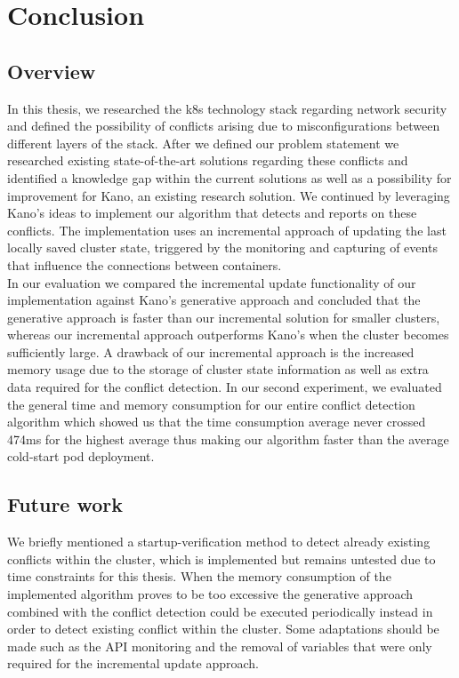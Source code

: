 \chapter{Conclusion}                     \label{ch:conclusion}
\section{Overview} \label{sec:overview}
In this thesis, we researched the \acrshort{k8s} technology stack regarding network security and defined the possibility of conflicts arising due to misconfigurations between different layers of the stack. After we defined our problem statement we researched existing state-of-the-art solutions regarding these conflicts and identified a knowledge gap within the current solutions as well as a possibility for improvement for Kano, an existing research solution. We continued by leveraging Kano's ideas to implement our algorithm that detects and reports on these conflicts. The implementation uses an incremental approach of updating the last locally saved cluster state, triggered by the monitoring and capturing of events that influence the connections between containers. 
\\[10pt]

In our evaluation we compared the incremental update functionality of our implementation against Kano's generative approach and concluded that the generative approach is faster than our incremental solution for smaller clusters, whereas our incremental approach outperforms Kano's when the cluster becomes sufficiently large. A drawback of our incremental approach is the increased memory usage due to the storage of cluster state information as well as extra data required for the conflict detection. In our second experiment, we evaluated the general time and memory consumption for our entire conflict detection algorithm which showed us that the time consumption average never crossed 474ms for the highest average thus making our algorithm faster than the average cold-start pod deployment.
\\[10pt]



\section{Future work} \label{sec:futurework}
We briefly mentioned a startup-verification method to detect already existing conflicts within the cluster, which is implemented but remains untested due to time constraints for this thesis. When the memory consumption of the implemented algorithm proves to be too excessive the generative approach combined with the conflict detection could be executed periodically instead in order to detect existing conflict within the cluster. Some adaptations should be made such as the API monitoring and the removal of variables that were only required for the incremental update approach.
\\[10pt]

